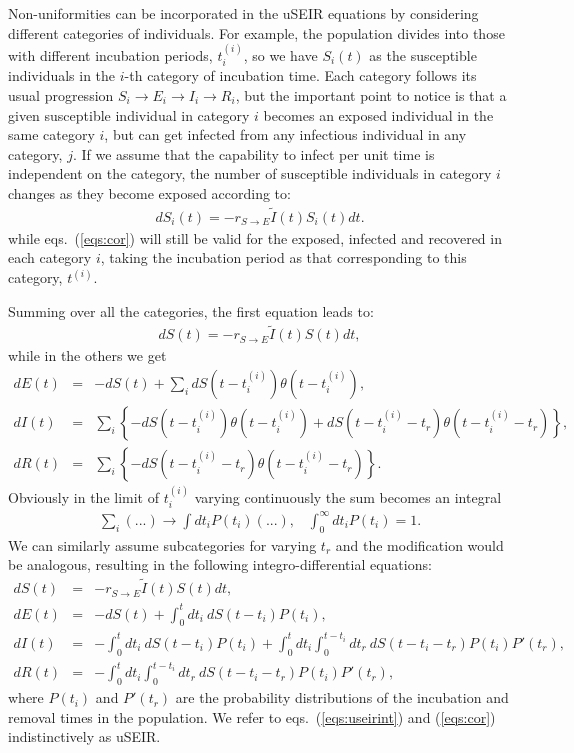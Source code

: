\documentclass[a4paper,oneside,11pt]{article}
\begin{document}
 Non-uniformities can be incorporated in the uSEIR equations by considering different categories of individuals. For example, the population divides   into those with different incubation periods, $t_i^{(i)}$, so we have $S_i(t)$ as the susceptible individuals in the $i$-th category of incubation time. Each category follows its usual progression $S_i\rightarrow E_i \rightarrow I_i \rightarrow R_i$, but the important point to notice is that a given susceptible individual in category $i$ becomes an exposed individual in the same category $i$, but can get infected from any infectious individual in any category, $j$. If we assume that the capability to infect per unit time is independent on the category, the number of susceptible individuals in category $i$ changes as they become exposed according to:
\begin{eqnarray}
d S_i(t) = - r_{S\rightarrow E} \tilde{I}(t) S_i(t) dt.
\end{eqnarray}
while eqs.~(\ref{eqs:cor}) will still be valid for the exposed, infected and recovered in each category $i$, taking the incubation period as that corresponding to this category, $t^{(i)}$.

Summing over all the categories, the first equation leads to:
\begin{eqnarray}
d S(t) = - r_{S\rightarrow E} \tilde{I}(t) S(t) dt,
\end{eqnarray}
while in the others we get
\begin{eqnarray}
d E(t) &=& -d S(t) + \sum_i d S(t-t^{(i)}_i) \theta(t-t^{(i)}_i) ,\nonumber\\
d I(t) &=& \sum_i  \left\{-d S(t-t^{(i)}_i) \theta(t-t^{(i)}_i)+ d S(t-t^{(i)}_i-t_r) \theta(t-t^{(i)}_i-t_r)\right\},\nonumber\\
d R(t) &=& \sum_i \left\{- d S(t - t^{(i)}_i - t_r) \theta(t-t^{(i)}_i-t_r)\right\}.
\label{eqs:corint}
\end{eqnarray}
Obviously in the limit of $t_i^{(i)}$ varying continuously the sum becomes an integral
\begin{eqnarray}
\sum_i  (...) \rightarrow \int dt_i P(t_i) (...), \;\;\; \int_0^\infty dt_i P(t_i) = 1.
\end{eqnarray}
We can similarly assume subcategories for varying $t_r$ and the modification would be analogous, resulting in the following integro-differential equations:
\begin{eqnarray}
d S(t) &=& - r_{S\rightarrow E} \tilde{I}(t) S(t) dt,\nonumber\\
d E(t) &=& -d S(t) + \int_0^{t} dt_i ~d S(t-t_i) P(t_i) ,\nonumber\\
d I(t) &=& -\int_0^{t} dt_i  ~d S(t-t_i) P(t_i) + \int_0^{t} d t_i \int_0^{t-t_i} dt_r~ dS(t-t_i-t_r) P(t_i) P'(t_r),\nonumber\\
d R(t) &=& -\int_0^{t} d t_i \int_0^{t-t_i} dt_r~ dS(t-t_i-t_r) P(t_i) P'(t_r),
\label{eqs:useirint}
\end{eqnarray}
where $P(t_i)$ and $P'(t_r)$ are the probability distributions of the incubation and removal times in the population. We refer to eqs.~(\ref{eqs:useirint}) and (\ref{eqs:cor}) indistinctively as uSEIR.
\end{document}
